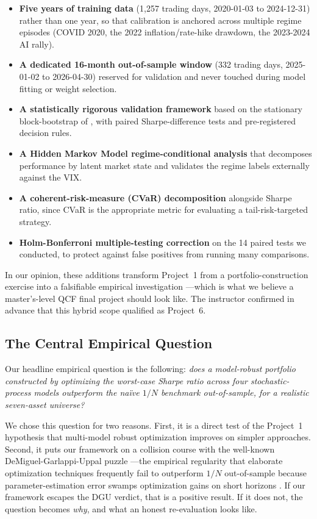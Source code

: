 \documentclass[11pt,letterpaper]{article}
\begin{document}
\begin{itemize}[leftmargin=*,nosep,topsep=4pt]
  \item \textbf{Five years of training data} (1{,}257 trading days, 2020-01-03 to 2024-12-31) rather than one year, so that calibration is anchored across multiple regime episodes (COVID 2020, the 2022 inflation/rate-hike drawdown, the 2023-2024 AI rally).
  \item \textbf{A dedicated 16-month out-of-sample window} (332 trading days, 2025-01-02 to 2026-04-30) reserved for validation and never touched during model fitting or weight selection.
  \item \textbf{A statistically rigorous validation framework} based on the stationary block-bootstrap of \citet{politis1994stationary}, with paired Sharpe-difference tests and pre-registered decision rules.
  \item \textbf{A Hidden Markov Model regime-conditional analysis} \citep{hamilton1989new} that decomposes performance by latent market state and validates the regime labels externally against the VIX.
  \item \textbf{A coherent-risk-measure (CVaR) decomposition} \citep{artzner1999coherent, rockafellar2002conditional} alongside Sharpe ratio, since CVaR is the appropriate metric for evaluating a tail-risk-targeted strategy.
  \item \textbf{Holm-Bonferroni multiple-testing correction} \citep{holm1979simple} on the 14 paired tests we conducted, to protect against false positives from running many comparisons.
\end{itemize}

In our opinion, these additions transform Project~1 from a portfolio-construction exercise into a falsifiable empirical investigation —which is what we believe a master's-level QCF final project should look like. The instructor confirmed in advance that this hybrid scope qualified as Project~6.

\subsection{The Central Empirical Question}

Our headline empirical question is the following: \emph{does a model-robust portfolio constructed by optimizing the worst-case Sharpe ratio across four stochastic-process models outperform the naïve $1/N$ benchmark out-of-sample, for a realistic seven-asset universe?}

We chose this question for two reasons. First, it is a direct test of the Project~1 hypothesis that multi-model robust optimization improves on simpler approaches. Second, it puts our framework on a collision course with the well-known DeMiguel-Garlappi-Uppal puzzle —the empirical regularity that elaborate optimization techniques frequently fail to outperform $1/N$ out-of-sample because parameter-estimation error swamps optimization gains on short horizons \citep{demiguel2009optimal}. If our framework escapes the DGU verdict, that is a positive result. If it does not, the question becomes \emph{why}, and what an honest re-evaluation looks like.
\end{document}
